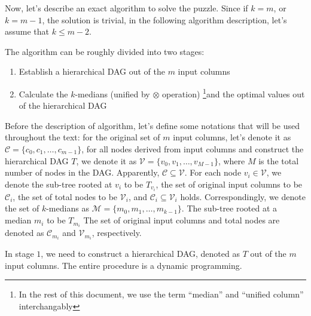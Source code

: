 
Now, let's describe an exact algorithm to solve the puzzle. Since if $k
= m$, or $k = m-1$, the solution is trivial, in the following algorithm
description, let's assume that $k \leq m-2$.

The algorithm can be roughly divided into two stages:

\begin{enumerate}

    \item Establish a hierarchical {DAG} out of the $m$ input columns 

    \item Calculate the $k$-medians (unified by $\otimes$ operation)
    \footnote{In the rest of this document, we use the term ``median'' and
    ``unified column'' interchangably}and the optimal values out of the
    hierarchical {DAG}

\end{enumerate}
    
Before the description of algorithm, let's define some notations that will
be used throughout the text: for the original set of $m$ input columns,
let's denote it as $\mathcal{C} = \{ c_0, c_1, \ldots, c_{m-1} \}$, for
all nodes derived from input columns and construct the hierarchical {DAG}
$T$, we denote it as $\mathcal{V} = \{ v_0, v_1, \ldots, v_{M-1} \}$,
where $M$ is the total number of nodes in the {DAG}.  Apparently,
$\mathcal{C} \subseteq \mathcal{V}$. For each node $v_i \in \mathcal{V}$,
we denote the sub-tree rooted at $v_i$ to be $T_{v_i}$, the set of original
input columns to be $\mathcal{C}_i$, the set of total nodes to be 
$\mathcal{V}_i$, and $\mathcal{C}_i \subseteq \mathcal{V}_i$ holds.
Correspondingly, we denote the set of $k$-medians as $\mathcal{M} =
\{m_0, m_1, \ldots, m_{k-1}\}$.  The sub-tree rooted at a median $m_i$
to be $T_{m_i}$ The set of original input columns and total nodes are
denoted as $\mathcal{C}_{m_i}$ and $\mathcal{V}_{m_i}$, respectively.

In stage $1$, we need to construct a hierarchical {DAG}, denoted as $T$
out of the $m$ input columns. The entire procedure is a dynamic programming.

